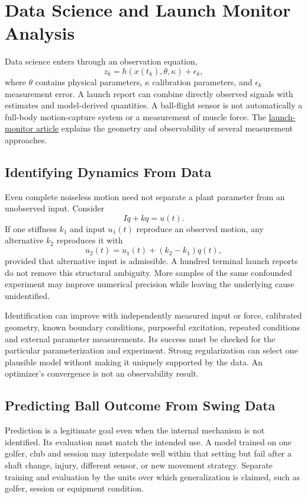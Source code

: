 \section{Data Science and Launch Monitor Analysis}

Data science enters through an observation equation,
\[
z_k=h(x(t_k),\theta,\kappa)+\epsilon_k,
\]
where $\theta$ contains physical parameters, $\kappa$ calibration parameters, and $\epsilon_k$ measurement error. A launch report can combine directly observed signals with estimates and model-derived quantities. A ball-flight sensor is not automatically a full-body motion-capture system or a measurement of muscle force. The \href{https://affinedrift.com/articles/technology-launch-monitors.html}{launch-monitor article} explains the geometry and observability of several measurement approaches.

\subsection{Identifying Dynamics From Data}

Even complete noiseless motion need not separate a plant parameter from an unobserved input. Consider
\[
I\ddot q+kq=u(t).
\]
If one stiffness $k_1$ and input $u_1(t)$ reproduce an observed motion, any alternative $k_2$ reproduces it with
\[
u_2(t)=u_1(t)+(k_2-k_1)q(t),
\]
provided that alternative input is admissible. A hundred terminal launch reports do not remove this structural ambiguity. More samples of the same confounded experiment may improve numerical precision while leaving the underlying cause unidentified.

Identification can improve with independently measured input or force, calibrated geometry, known boundary conditions, purposeful excitation, repeated conditions and external parameter measurements. Its success must be checked for the particular parameterization and experiment. Strong regularization can select one plausible model without making it uniquely supported by the data. An optimizer's convergence is not an observability result.

\subsection{Predicting Ball Outcome From Swing Data}

Prediction is a legitimate goal even when the internal mechanism is not identified. Its evaluation must match the intended use. A model trained on one golfer, club and session may interpolate well within that setting but fail after a shaft change, injury, different sensor, or new movement strategy. Separate training and evaluation by the units over which generalization is claimed, such as golfer, session or equipment condition.

